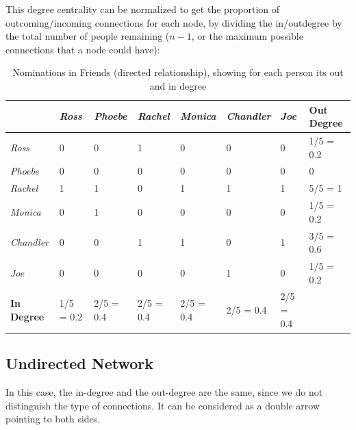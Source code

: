 \documentclass[
  notitlepage,
  onecolumn,
  openany]{book}
\begin{document}
This degree centrality can be normalized to get the proportion of outcoming/incoming connections for each node, by dividing the in/outdegree by the total number of people remaining (\(n-1\), or the maximum possible connections that a node could have):

\begin{table}[h]
\centering
\begin{tabular}{@{}llllllll@{}}
\toprule
                   & \textit{Ross} & \textit{Phoebe} & \textit{Rachel} & \textit{Monica} & \textit{Chandler} & \textit{Joe} & \textbf{Out Degree} \\ \midrule
\textit{Ross}      & 0             & 0               & 1               & 0               & 0                 & 0            & 1/5 = 0.2           \\
\textit{Phoebe}    & 0             & 0               & 0               & 0               & 0                 & 0            & 0                   \\
\textit{Rachel}    & 1             & 1               & 0               & 1               & 1                 & 1            & 5/5 = 1             \\
\textit{Monica}    & 0             & 1               & 0               & 0               & 0                 & 0            & 1/5 = 0.2           \\
\textit{Chandler}  & 0             & 0               & 1               & 1               & 0                 & 1            & 3/5 = 0.6           \\
\textit{Joe}       & 0             & 0               & 0               & 0               & 1                 & 0            & 1/5 = 0.2           \\
\textbf{In Degree} & 1/5 = 0.2     & 2/5 = 0.4       & 2/5 = 0.4       & 2/5 = 0.4       & 2/5 = 0.4         & 2/5 = 0.4    &                     \\ \bottomrule
\end{tabular}
\caption{Nominations in Friends (directed relationship), showing for each person its out and in degree}
\label{tab:norm_dir_degree}
\end{table}

\hypertarget{undirected-network}{%
\subsection{Undirected Network}\label{undirected-network}}

In this case, the in-degree and the out-degree are the same, since we do not distinguish the type of connections. It can be considered as a double arrow pointing to both sides.
\end{document}
